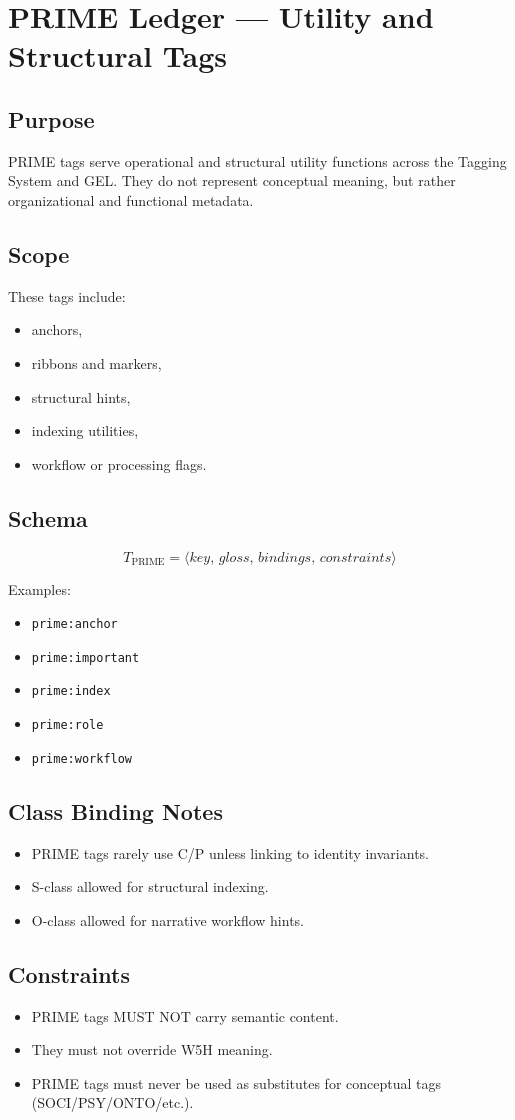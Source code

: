 \chapter{PRIME Ledger --- Utility and Structural Tags}
\label{chap:PRIME_Ledger}

\section{Purpose}

PRIME tags serve operational and structural utility functions across the
Tagging System and GEL. They do not represent conceptual meaning, but rather
organizational and functional metadata.

\section{Scope}

These tags include:
\begin{itemize}
    \item anchors,
    \item ribbons and markers,
    \item structural hints,
    \item indexing utilities,
    \item workflow or processing flags.
\end{itemize}

\section{Schema}

\[
T_{\text{PRIME}} = \langle key,\, gloss,\, bindings,\, constraints \rangle
\]

Examples:
\begin{itemize}
    \item \texttt{prime:anchor}
    \item \texttt{prime:important}
    \item \texttt{prime:index}
    \item \texttt{prime:role}
    \item \texttt{prime:workflow}
\end{itemize}

\section{Class Binding Notes}

\begin{itemize}
    \item PRIME tags rarely use C/P unless linking to identity invariants.
    \item S-class allowed for structural indexing.
    \item O-class allowed for narrative workflow hints.
\end{itemize}

\section{Constraints}

\begin{itemize}
    \item PRIME tags MUST NOT carry semantic content.
    \item They must not override W5H meaning.
    \item PRIME tags must never be used as substitutes for conceptual tags 
          (SOCI/PSY/ONTO/etc.).
\end{itemize}
